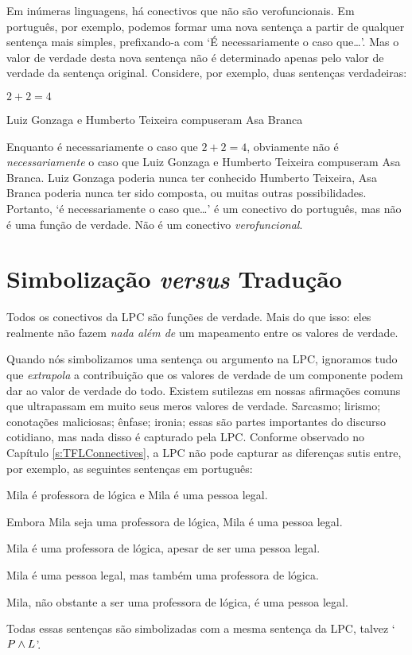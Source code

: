 Em inúmeras linguagens, há conectivos que não são verofuncionais.
Em português, por exemplo, podemos formar uma nova sentença a partir de qualquer sentença mais simples, prefixando-a com `É necessariamente o caso que\ldots'.
Mas o valor de verdade desta nova sentença não é determinado apenas pelo valor de verdade da sentença original.
Considere, por exemplo, duas sentenças verdadeiras:
	\begin{earg}
		\item $2 + 2 = 4$
		\item Luiz Gonzaga e Humberto Teixeira compuseram Asa Branca
	\end{earg}
Enquanto é necessariamente o caso que $2+2=4$, obviamente não é \emph{necessariamente} o caso que Luiz Gonzaga e Humberto Teixeira compuseram Asa Branca.
Luiz Gonzaga poderia nunca ter conhecido Humberto Teixeira, Asa Branca poderia nunca ter sido composta, ou muitas outras possibilidades.
Portanto, `é necessariamente o caso que\ldots' é um conectivo do português, mas não é uma função de verdade.
Não é um conectivo \emph{verofuncional}.



\section{Simbolização \emph{versus} Tradução}
Todos os conectivos da LPC são funções de verdade.
Mais do que isso:  eles realmente não fazem \emph{nada além de} um mapeamento entre os valores de verdade.  

Quando nós simbolizamos uma sentença ou argumento na LPC, ignoramos tudo que \emph{extrapola} a contribuição que os valores de verdade de um componente podem dar ao valor de verdade do todo.
Existem sutilezas em nossas afirmações comuns que ultrapassam em muito seus meros valores de verdade.
Sarcasmo; lirismo; conotações maliciosas; ênfase; ironia; essas são partes importantes do discurso cotidiano, mas nada disso é capturado pela LPC.
Conforme observado no Capítulo \ref{s:TFLConnectives},
a LPC não pode capturar as diferenças sutis entre, por exemplo, as seguintes sentenças em português:
	\begin{earg}
		\item Mila é professora de lógica e Mila é uma pessoa legal.
		\item Embora Mila seja uma professora de lógica, Mila é uma pessoa legal.
		\item Mila é uma professora de lógica, apesar de ser uma pessoa legal.
		\item Mila é uma pessoa legal, mas também uma professora de lógica.
		\item Mila, não obstante a ser uma professora de lógica, é uma pessoa legal.
	\end{earg}
Todas essas sentenças são simbolizadas com a mesma sentença da LPC, talvez `$P \wedge L$'.

